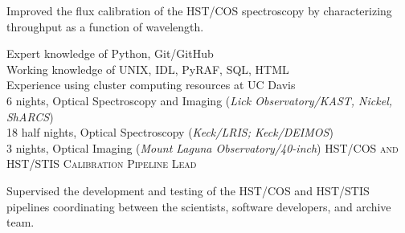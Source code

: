 \documentclass[10pt]{cv}
\begin{document}
\begin{llist}
\begin{minipage}[l]{0.7\textwidth}
Improved the flux calibration of the HST/COS spectroscopy by characterizing throughput as a function of wavelength.\\
\end{minipage}\vspace{0.15cm}
\vspace{-0.1in}  
Expert knowledge of Python, Git/GitHub\\
Working knowledge of UNIX, IDL, PyRAF, SQL, HTML\\
Experience using cluster computing resources at UC Davis\\ 
%
\vspace{-0.1in}   
6 nights, Optical Spectroscopy and Imaging ({\it Lick Observatory/KAST, Nickel, ShARCS})\\
18 half nights, Optical Spectroscopy ({\it Keck/LRIS; Keck/DEIMOS})\\
3 nights, Optical Imaging ({\it Mount Laguna Observatory/40-inch})
%
\vspace{-0.1in}   
\textsc{HST/COS and HST/STIS Calibration Pipeline Lead}\\
\begin{minipage}[l]{0.7\textwidth}\vspace{0.15cm}
Supervised the development and testing of the HST/COS and HST/STIS pipelines coordinating between the scientists, software developers, and archive team. \\

\end{minipage}
\end{llist}
\end{document}
